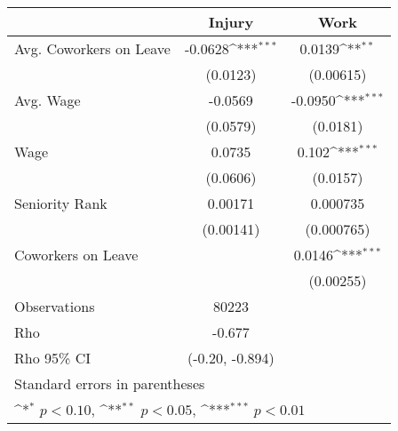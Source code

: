 {
\def\sym#1{\ifmmode^{#1}\else\(^{#1}\)\fi}
\begin{tabular}{l*{2}{c}}
\hline\hline
                    &      Injury         &        Work         \\
\hline
Avg. Coworkers on Leave&     -0.0628\sym{***}&      0.0139\sym{**} \\
                    &    (0.0123)         &   (0.00615)         \\
[1em]
Avg. Wage           &     -0.0569         &     -0.0950\sym{***}\\
                    &    (0.0579)         &    (0.0181)         \\
[1em]
Wage                &      0.0735         &       0.102\sym{***}\\
                    &    (0.0606)         &    (0.0157)         \\
[1em]
Seniority Rank      &     0.00171         &    0.000735         \\
                    &   (0.00141)         &  (0.000765)         \\
[1em]
Coworkers on Leave  &                     &      0.0146\sym{***}\\
                    &                     &   (0.00255)         \\
\hline
Observations        &       80223         &                     \\
Rho                 &      -0.677         &                     \\
Rho 95\% CI         &(-0.20, -0.894)         &                     \\
\hline\hline
\multicolumn{3}{l}{\footnotesize Standard errors in parentheses}\\
\multicolumn{3}{l}{\footnotesize \sym{*} \(p<0.10\), \sym{**} \(p<0.05\), \sym{***} \(p<0.01\)}\\
\end{tabular}
}
